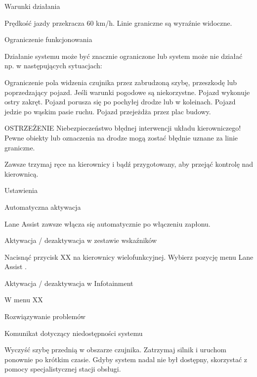 Warunki działania
\begin{itemizeTick}
	\itemTick Prędkość jazdy przekracza 60 km/h.
	\itemTick Linie graniczne są wyraźnie widoczne.
\end{itemizeTick}

Ograniczenie funkcjonowania

Działanie systemu może być znacznie ograniczone lub system może nie działać np. w następujących sytuacjach:
\begin{itemizeTriangle}
	\itemTriangle Ograniczenie pola widzenia czujnika przez zabrudzoną szybę, przeszkodę lub poprzedzający pojazd.
	\itemTriangle Jeśli warunki pogodowe są niekorzystne.
	\itemTriangle Pojazd wykonuje ostry zakręt.
	\itemTriangle Pojazd porusza się po pochyłej drodze lub w koleinach.
	\itemTriangle Pojazd jedzie po wąskim pasie ruchu.
	\itemTriangle Pojazd przejeżdża przez plac budowy.
\end{itemizeTriangle}

OSTRZEŻENIE
Niebezpieczeństwo błędnej interwencji układu kierowniczego!
Pewne obiekty lub oznaczenia na drodze mogą zostać błędnie uznane za linie graniczne.

\begin{itemizeTriangle}
	\itemTriangle Zawsze trzymaj ręce na kierownicy i bądź przygotowany, aby przejąć kontrolę nad kierownicą.
\end{itemizeTriangle}

Ustawienia

Automatyczna aktywacja

Lane Assist zawsze włącza się automatycznie po włączeniu zapłonu.

Aktywacja / dezaktywacja w zestawie wskaźników

\begin{itemizeArrow}
	\itemArrow Nacisnąć przycisk XX na kierownicy wielofunkcyjnej.
	\itemArrow Wybierz pozycję menu Lane Assist .
\end{itemizeArrow}

Aktywacja / dezaktywacja w Infotainment

W menu XX

Rozwiązywanie problemów

Komunikat dotyczący niedostępności systemu

\begin{itemizeArrow}
	\itemArrow Wyczyść szybę przednią w obszarze czujnika.
	\itemArrow Zatrzymaj silnik i uruchom ponownie po krótkim czasie.
	\itemArrow Gdyby system nadal nie był dostępny, skorzystać z pomocy specjalistycznej stacji obsługi.
\end{itemizeArrow}

